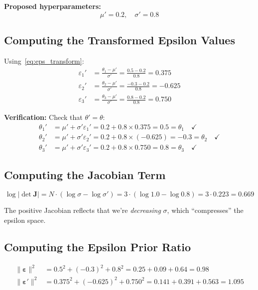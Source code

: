 \documentclass[11pt,a4paper]{article}
\theoremstyle{definition}
\newcommand{\eps}{\varepsilon}
\begin{document}
\textbf{Proposed hyperparameters:}
\begin{equation}
    \mu' = 0.2, \quad \sigma' = 0.8
\end{equation}

\subsection{Computing the Transformed Epsilon Values}

Using~\eqref{eq:eps_transform}:
\begin{align}
    \eps_1' &= \frac{\theta_1 - \mu'}{\sigma'} = \frac{0.5 - 0.2}{0.8} = 0.375 \\
    \eps_2' &= \frac{\theta_2 - \mu'}{\sigma'} = \frac{-0.3 - 0.2}{0.8} = -0.625 \\
    \eps_3' &= \frac{\theta_3 - \mu'}{\sigma'} = \frac{0.8 - 0.2}{0.8} = 0.750
\end{align}

\textbf{Verification:} Check that $\theta' = \theta$:
\begin{align}
    \theta_1' &= \mu' + \sigma' \eps_1' = 0.2 + 0.8 \times 0.375 = 0.5 = \theta_1 \quad \checkmark \\
    \theta_2' &= \mu' + \sigma' \eps_2' = 0.2 + 0.8 \times (-0.625) = -0.3 = \theta_2 \quad \checkmark \\
    \theta_3' &= \mu' + \sigma' \eps_3' = 0.2 + 0.8 \times 0.750 = 0.8 = \theta_3 \quad \checkmark
\end{align}

\subsection{Computing the Jacobian Term}

\begin{equation}
    \log |\det \bm{J}| = N \cdot (\log \sigma - \log \sigma') = 3 \cdot (\log 1.0 - \log 0.8) = 3 \cdot 0.223 = 0.669
\end{equation}

The positive Jacobian reflects that we're \emph{decreasing} $\sigma$, which ``compresses''
the epsilon space.

\subsection{Computing the Epsilon Prior Ratio}

\begin{align}
    \|\bm{\eps}\|^2 &= 0.5^2 + (-0.3)^2 + 0.8^2 = 0.25 + 0.09 + 0.64 = 0.98 \\
    \|\bm{\eps}'\|^2 &= 0.375^2 + (-0.625)^2 + 0.750^2 = 0.141 + 0.391 + 0.563 = 1.095
\end{align}
\end{document}
